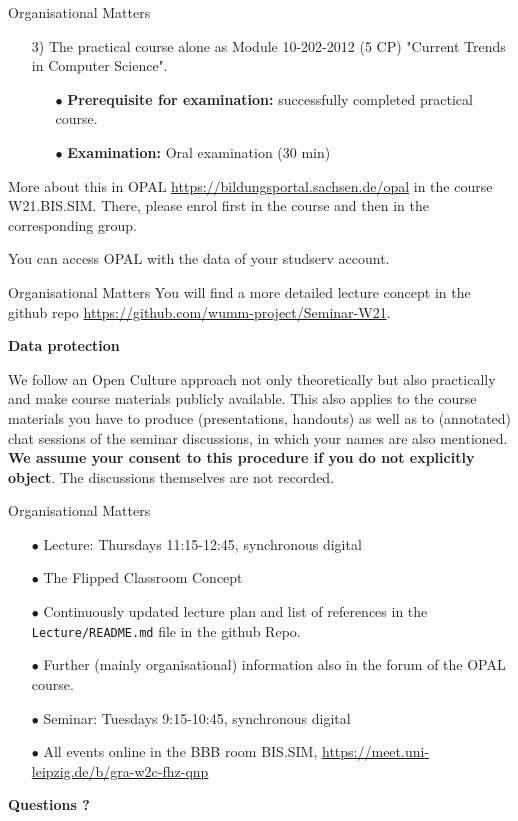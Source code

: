 \documentclass{beamer}
\newcommand{\ueberschrift}[1]{\begin{center}\bf #1\end{center}}
\begin{document}
\begin{frame}{Organisational Matters}
\begin{itemize}
\item[3)] The practical course alone as Module 10-202-2012 (5 CP) "Current
  Trends in Computer Science".
  \begin{itemize}[noitemsep]
  \item[$\bullet$] \textbf{Prerequisite for examination:} successfully
    completed practical course.
  \item[$\bullet$] \textbf{Examination:} Oral examination (30 min)
  \end{itemize}
\end{itemize}
More about this in OPAL \url{https://bildungsportal.sachsen.de/opal} in the
course W21.BIS.SIM.  There, please enrol first in the course and then in the
corresponding group.

You can access OPAL with the data of your studserv account.

\end{frame}

\begin{frame}{Organisational Matters}
You will find a more detailed lecture concept in the github repo
\url{https://github.com/wumm-project/Seminar-W21}.

\ueberschrift{Data protection}

We follow an Open Culture approach not only theoretically but also practically
and make course materials publicly available. This also applies to the course
materials you have to produce (presentations, handouts) as well as to
(annotated) chat sessions of the seminar discussions, in which your names are
also mentioned. \textbf{We assume your consent to this procedure if you do not
  explicitly object}. The discussions themselves are not recorded.

\end{frame}

\begin{frame}{Organisational Matters}

\begin{itemize}
\item[$\bullet$] Lecture: Thursdays 11:15-12:45, synchronous digital
\item[$\bullet$] The Flipped Classroom Concept
\item[$\bullet$] Continuously updated lecture plan and list of references in
  the \texttt{Lecture/README.md} file in the github Repo.  
\item[$\bullet$] Further (mainly organisational) information also in the forum
  of the OPAL course.
\item[$\bullet$] Seminar: Tuesdays 9:15-10:45, synchronous digital
\item[$\bullet$] All events online in the BBB room BIS.SIM,
  \url{https://meet.uni-leipzig.de/b/gra-w2c-fhz-qnp}
\end{itemize}
\begin{center}\LARGE\bf
  Questions ?
\end{center}

\end{frame}
\end{document}
